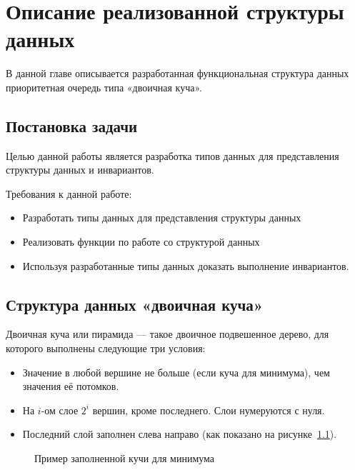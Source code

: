 \chapter{Описание реализованной структуры данных}
\label{chapter2}

В данной главе описывается разработанная функциональная структура данных приоритетная очередь типа «двоичная куча».

\section{Постановка задачи}
Целью данной работы является разработка типов данных для представления
структуры данных и инвариантов.

Требования к данной работе:
\begin{itemize}
 \item Разработать типы данных для представления структуры данных
 \item Реализовать функции по работе со структурой данных
 \item Используя разработанные типы данных доказать выполнение инвариантов.
\end{itemize}

\section{Структура данных «двоичная куча»}

\begin{definition}
Двоичная куча или пирамида \cite{DBLP:books/mg/CormenLRS01} — такое двоичное подвешенное дерево, для которого выполнены следующие три условия:
\begin{itemize}
 \item Значение в любой вершине не больше (если куча для минимума), чем значения её потомков.
 \item На $i$-ом слое $2^i$ вершин, кроме последнего. Слои нумеруются с нуля.
 \item Последний слой заполнен слева направо (как показано на рисунке~\ref{pic:min-heap}).
\end{itemize}
\end{definition}

\begin{figure}[h!]
  \caption{Пример заполненной кучи для минимума}
  \label{pic:min-heap}
\end{figure} 
% 


